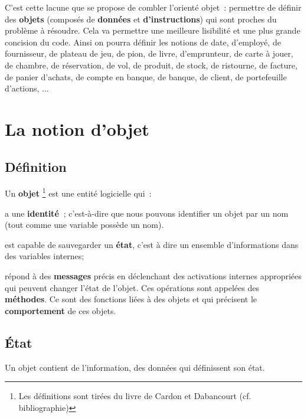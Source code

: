 	C'est cette lacune que se propose de combler
	l'orienté objet~: permettre de définir des
	\textbf{objets} (composés de \textbf{données} et
	\textbf{d'instructions}) qui sont proches du problème
	à résoudre. Cela va permettre une meilleure lisibilité et une plus
	grande concision du code. Ainsi on pourra définir les notions de date,
	d'employé, de fournisseur, de plateau de jeu, de pion,
	de livre, d'emprunteur, de carte à jouer, de chambre,
	de réservation, de vol, de produit, de stock, de ristourne, de facture,
	de panier d'achats, de compte en banque, de banque, de
	client, de portefeuille d'actions, ...

\section{La notion d'objet}

	\subsection{Définition}
	
		Un \textbf{objet}%
		\footnote{%
			Les définitions sont tirées du livre de Cardon et
			Dabancourt (cf. bibliographie)
		}
		est une entité logicielle qui~:
	
		\begin{liste}
		\item 
			a une \textbf{identité~}; c'est-à-dire que nous pouvons
			identifier un objet par un nom (tout comme une variable possède un
			nom).
		\item 
			est capable de sauvegarder un \textbf{état}, c'est à
			dire un ensemble d'informations dans des variables
			internes;
		\item 
			répond à des \textbf{messages} précis en déclenchant des activations
			internes appropriées qui peuvent changer l'état de
			l'objet. Ces opérations sont appelées des
			\textbf{méthodes}. Ce sont des fonctions liées à des objets et qui
			précisent le \textbf{comportement} de ces objets.
		\end{liste}

	\subsection{État}

		Un objet contient de l'information, des données qui
		définissent son état.

